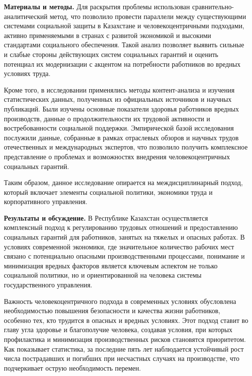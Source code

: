 {\bfseries Материалы и методы.} Для раскрытия проблемы использован
сравнительно-аналитический метод, что позволило провести параллели между
существующими системами социальной защиты в Казахстане и
человекоцентричными подходами, активно применяемыми в странах с развитой
экономикой и высокими стандартами социального обеспечения. Такой анализ
позволяет выявить сильные и слабые стороны действующих систем социальных
гарантий и оценить потенциал их модернизации с акцентом на потребности
работников во вредных условиях труда.

Кроме того, в исследовании применялись методы контент-анализа и изучения
статистических данных, полученных из официальных источников и научных
публикаций. Были изучены основные показатели здоровья работников вредных
производств, данные о продолжительности их трудовой активности и
востребованности социальной поддержки. Эмпирической базой исследования
послужили данные, собранные в рамках отраслевых обзоров и научных трудов
отечественных и международных экспертов, что позволило получить
комплексное представление о проблемах и возможностях внедрения
человекоцентричных социальных гарантий.

Таким образом, данное исследование опирается на междисциплинарный
подход, который включает элементы социальной политики, экономики труда и
корпоративного управления.

{\bfseries Результаты и обсуждение.} В Республике Казахстан осуществляется
комплексный подход к регулированию трудовых отношений и предоставлению
социальных гарантий для работников, занятых на тяжелых и опасных
работах. В условиях современной экономики, где значительное количество
рабочих мест связано с потенциально опасными производственными
процессами, понимание и минимизация вредных факторов является ключевым
аспектом не только социальной политики, но и ориентированной на человека
системы государственного управления.

Важность человекоцентричного подхода в современных условиях обусловлена
необходимостью повышения безопасности и качества жизни работников,
особенно тех, кто трудится в опасных и вредных условиях. Этот подход
ставит во главу угла здоровье и благополучие человека, создавая условия,
при которых профилактика и минимизация производственных рисков
становятся приоритетом. Как показывает статистика, за последние пять лет
наблюдается устойчивый рост числа пострадавших и погибших при несчастных
случаях на производстве, что подчеркивает острую необходимость перемен.

